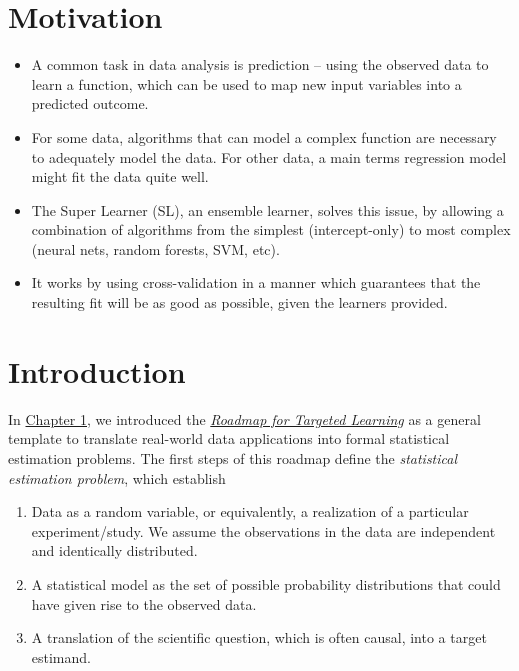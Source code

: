 \documentclass[12pt, krantz2,]{krantz}
\providecommand{\tightlist}{%
  \setlength{\itemsep}{0pt}\setlength{\parskip}{0pt}}
\theoremstyle{definition}
\theoremstyle{definition}
\theoremstyle{definition}
\newcommand{\1}{\mathbbm{1}}
\begin{document}
\hypertarget{motivation}{%
\section*{Motivation}\label{motivation}}


\begin{itemize}
\tightlist
\item
  A common task in data analysis is prediction -- using the observed data to
  learn a function, which can be used to map new input variables into a
  predicted outcome.
\item
  For some data, algorithms that can model a complex function are necessary to
  adequately model the data. For other data, a main terms regression model might
  fit the data quite well.
\item
  The Super Learner (SL), an ensemble learner, solves this issue, by allowing a
  combination of algorithms from the simplest (intercept-only) to most complex
  (neural nets, random forests, SVM, etc).
\item
  It works by using cross-validation in a manner which guarantees that the
  resulting fit will be as good as possible, given the learners provided.
\end{itemize}

\hypertarget{introduction-2}{%
\section{Introduction}\label{introduction-2}}

In \protect\hyperlink{intro}{Chapter 1}, we introduced the \protect\hyperlink{roadmap}{\emph{Roadmap for Targeted
Learning}} as a general template to translate real-world data
applications into formal statistical estimation problems. The first steps of
this roadmap define the \emph{statistical estimation problem}, which establish

\begin{enumerate}
\def\labelenumi{\arabic{enumi}.}
\tightlist
\item
  Data as a random variable, or equivalently, a realization of a particular
  experiment/study. We assume the observations in the data are independent and
  identically distributed.
\item
  A statistical model as the set of possible probability distributions that
  could have given rise to the observed data.
\item
  A translation of the scientific question, which is often causal, into a
  target estimand.
\end{enumerate}
\end{document}
